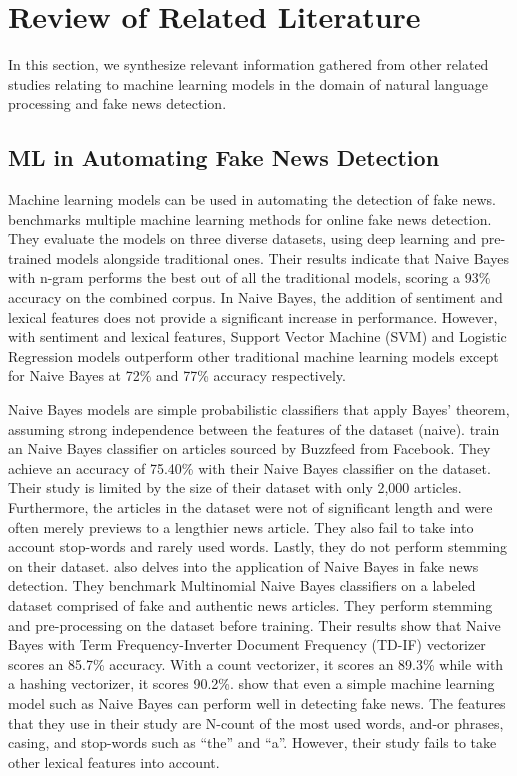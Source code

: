 \chapter{Review of Related Literature}
\label{sec:relatedlit}

In this section, we synthesize relevant information gathered from other related studies relating to machine learning models in the domain of natural language processing and fake news detection.

\section{ML in Automating Fake News Detection}

Machine learning models can be used in automating the detection of fake news.  benchmarks multiple machine learning methods for online fake news detection. They evaluate the models on three diverse datasets, using deep learning and pre-trained models alongside traditional ones. Their results indicate that Naive Bayes with n-gram performs the best out of all the traditional models, scoring a 93\% accuracy on the combined corpus. In Naive Bayes, the addition of sentiment and lexical features does not provide a significant increase in performance. However, with sentiment and lexical features, Support Vector Machine (SVM) and Logistic Regression models outperform other traditional machine learning models except for Naive Bayes at 72\% and 77\% accuracy respectively.

Naive Bayes models are simple probabilistic classifiers that apply Bayes' theorem, assuming strong independence between the features of the dataset (naive).  train an Naive Bayes classifier on articles sourced by Buzzfeed from Facebook. They achieve an accuracy of 75.40\% with their Naive Bayes classifier on the dataset. Their study is limited by the size of their dataset with only 2,000 articles. Furthermore, the articles in the dataset were not of significant length and were often merely previews to a lengthier news article. They also fail to take into account stop-words and rarely used words. Lastly, they do not perform stemming on their dataset.  also delves into the application of Naive Bayes in fake news detection. They benchmark Multinomial Naive Bayes classifiers on a labeled dataset comprised of fake and authentic news articles. They perform stemming and pre-processing on the dataset before training. Their results show that Naive Bayes with Term Frequency-Inverter Document Frequency (TD-IF) vectorizer scores an 85.7\% accuracy. With a count vectorizer, it scores an 89.3\% while with a hashing vectorizer, it scores 90.2\%.  show that even a simple machine learning model such as Naive Bayes can perform well in detecting fake news. The features that they use in their study are N-count of the most used words, and-or phrases, casing, and stop-words such as \enquote{the} and \enquote{a}. However, their study fails to take other lexical features into account.

